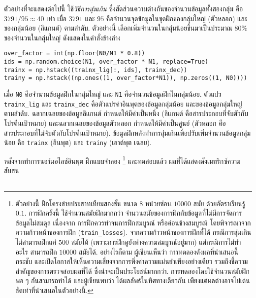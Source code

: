 \begin{Exercise}
ตัวอย่างที่จะแสดงต่อไปนี้ ใช้\textit{วิธีการสุ่มเกิน} 
ซึ่งสัดส่วนความต่างกันของจำนวนข้อมูลทั้งสองกลุ่ม คือ $3791/95 \approx 40$ เท่า
เมื่อ $3791$ และ $95$ คือจำนวนจุดข้อมูลในชุดฝึกของกลุ่มใหญ่ (ตัวหลอก) และของกลุ่มน้อย (ลิแกนต์) ตามลำดับ.
ตัวอย่างนี้ เลือกเพิ่มจำนวนในกลุ่มน้อยขึ้นมาเป็นประมาณ $80\%$ ของจำนวนในกลุ่มใหญ่ ดังแสดงในคำสั่งข้างล่าง
\begin{Verbatim}[fontsize=\small]
over_factor = int(np.floor(N0/N1 * 0.8))
ids = np.random.choice(N1, over_factor * N1, replace=True)
trainx = np.hstack((trainx_lig[:, ids], trainx_dec))
trainy = np.hstack((np.ones((1, over_factor*N1)), np.zeros((1, N0))))
\end{Verbatim}
เมื่อ \verb|N0| คือจำนวนข้อมูลฝึกในกลุ่มใหญ่
และ \verb|N1| คือจำนวนข้อมูลฝึกในกลุ่มน้อย.
ตัวแปร \verb|trainx_lig| และ \verb|trainx_dec| คือตัวแปรค่าอินพุตของข้อมูลกลุ่มน้อย และของข้อมูลกลุ่มใหญ่ ตามลำดับ.
ฉลากเฉลยของข้อมูลลิแกนต์ กำหนดให้มีค่าเป็นหนึ่ง (ลิแกนต์ คือสารประกอบที่จับตัวกับโปรตีนเป้าหมาย)
และฉลากเฉลยของข้อมูลตัวหลอก กำหนดให้มีค่าเป็นศูนย์ (ตัวหลอก คือสารประกอบที่ไม่จับตัวกับโปรตีนเป้าหมาย).
ข้อมูลฝึกหลังทำการสุ่มเกินเพื่อปรับเพิ่มจำนวนข้อมูลกลุ่มน้อย 
คือ \verb|trainx| (อินพุต) และ \verb|trainy| (เอาต์พุต เฉลย).

หลังจากทำการนอร์มอไลซ์อินพุต ฝึกแบบจำลอง%
\footnote{%
ตัวอย่างนี้ ฝึกโครงข่ายประสาทเทียมสองชั้น ขนาด $8$ หน่วยซ่อน $10000$ สมัย ด้วยอัตราเรียนรู้ $0.1$.
การฝึกครั้งนี้ ใช้จำนวนสมัยฝึกมากกว่า จำนวนสมัยของการฝึกกับข้อมูลที่ไม่มีการจัดการข้อมูลไม่สมดุล
เนื่องจาก การฝึกควรทำจนการฝึกสมบูรณ์ หรือค่อนข้างสมบูรณ์ โดยพิจารณาจากความก้าวหน้าของการฝึก (\texttt{train\_losses}).
จากความก้าวหน้าของการฝึกที่ได้ กรณีการสุ่มเกิน ไม่สามารถฝึกแค่ $500$ สมัยได้ (เพราะการฝึกดูยังห่างความสมบูรณ์อยู่มาก)
แต่กรณีการไม่ทำอะไร สามารถฝึก $10000$ สมัยได้.
อย่างไรก็ตาม ผู้เขียนเห็นว่า การทดลองดังผลที่นำเสนอนี้กระชับ และเปิดโอกาสให้เห็นความเสี่ยงจากการพึ่งค่าความแม่นยำเพียงอย่างเดียว รวมถึงชี้ความสำคัญของการตรวจสอบผลที่ได้
ซึ่งน่าจะเป็นประโยชน์มากกว่า.
การทดลองโดยใช้จำนวนสมัยฝึกพอ ๆ กันสามารถทำได้ และผู้เขียนพบว่า ได้ผลลัพธ์ในทิศทางเดียวกัน เพียงแต่ผลต่างอาจไม่เด่นชัดเท่าที่นำเสนอในตัวอย่างนี้.
} และทดสอบแล้ว
ผลที่ได้แสดงดังเมทริกซ์ความสับสน
%
\begin{center}
	\begin{tabular}{cccc}
		

\end{tabular}
\end{center}
\end{Exercise}
